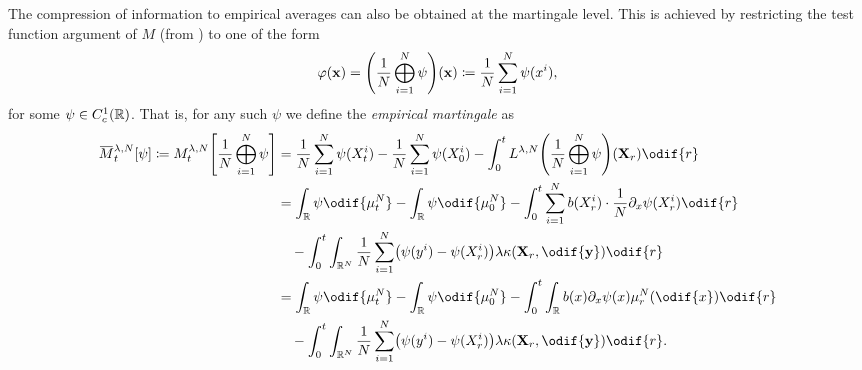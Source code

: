 The compression of information to empirical averages can also be obtained at the martingale level.
This is achieved by restricting the test function argument of \(M\) (from ) to one of the form
\begin{equation}
  \varphi(\bm{x}) = \br*{ \frac{1}{N} \bigoplus_{i=1}^N  \psi }(\bm{x})
  \coloneqq \frac{1}{N} \sum_{i=1}^N \psi(x^i),
\end{equation}
for some \( \psi \in C_c^1(\mathbb{R}) \).
That is, for any such \( \psi \) we define the \textit{empirical martingale} as
\begin{equation}\label{eq:emp-M-derivation-start}
  \begin{split}
    \ol{M}_t^{\lambda, N}[\psi] \coloneqq
    M_t^{\lambda, N}\sbr*{\frac{1}{N} \bigoplus_{i=1}^N \psi}
     & = \frac{1}{N} \sum_{i=1}^N \psi(X_t^i) - \frac{1}{N} \sum_{i=1}^N \psi(X_0^i) - \int_0^t L^{\lambda, N} \br*{\frac{1}{N}\bigoplus_{i=1}^N \psi} (\bm{X}_r) \odif{r} \\
     & = \int_\potspace \psi \odif{\mu_t^N} - \int_\potspace \psi \odif{\mu_0^N}
    - \int_0^t \sum_{i=1}^N b(X_{r}^i) \cdot \frac{1}{N} \partial_{x} \psi(X_{r}^i) \odif{r}                                                                               \\
     & \quad - \int_0^t \int_{\potspace^N} \frac{1}{N} \sum_{i=1}^N \br*{ \psi(y^i) - \psi(X_{r}^i) } \lambda \kappa(\bm{X}_r, \odif{\bm{y}}) \odif{r}                     \\
     & = \int_\potspace \psi \odif{\mu_t^N} - \int_\potspace \psi \odif{\mu_0^N}
    - \int_0^t \int_\potspace b(x) \partial_{x} \psi(x) \mu_r^N(\odif{x}) \odif{r}                                                                                         \\
     & \quad - \int_0^t \int_{\potspace^N} \frac{1}{N} \sum_{i=1}^N \br*{ \psi(y^i) - \psi(X_{r}^i) } \lambda \kappa(\bm{X}_r, \odif{\bm{y}}) \odif{r}.
  \end{split}
\end{equation}
